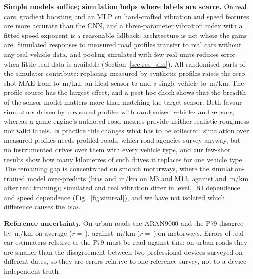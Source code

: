 \textbf{Simple models suffice; simulation helps where labels are scarce.}
On real cars, gradient boosting and an MLP on hand-crafted vibration and speed features are more accurate than the CNN, and a three-parameter vibration index with a fitted speed exponent is a reasonable fallback; architecture is not where the gains are.
Simulated responses to measured road profiles transfer to real cars without any real vehicle data, and pooling simulated with few real units reduces error when little real data is available (Section~\ref{sec:res_sim}).
All randomised parts of the simulator contribute: replacing measured by synthetic profiles raises the zero-shot MAE from \zsPsevenGbmMae{} to \zsIsoGbmMae\,m/km, an ideal sensor to \zsIdealGbmMae{} and a single vehicle to \zsFixVehGbmMae\,m/km.
The profile source has the largest effect, and a post-hoc check shows that the breadth of the sensor model matters more than matching the target sensor.
Both favour simulators driven by measured profiles with randomised vehicles and sensors, whereas a game engine's authored road meshes provide neither realistic roughness nor valid labels.
In practice this changes what has to be collected: simulation over measured profiles needs profiled roads, which road agencies survey anyway, but no instrumented drives over them with every vehicle type, and our few-shot results show how many kilometres of such drives it replaces for one vehicle type.
The remaining gap is concentrated on smooth motorways, where the simulation-trained model over-predicts (bias \zsPsevenGbmBiasMwThree{} and \zsPsevenGbmBiasMwThirteen\,m/km on M3 and M13, against \liraGbmBiasMwThree{} and \liraGbmBiasMwThirteen\,m/km after real training); simulated and real vibration differ in level, IRI dependence and speed dependence (Fig.~\ref{fig:simreal}), and we have not isolated which difference causes the bias.

\textbf{Reference uncertainty.}
On urban roads the ARAN9000 and the P79 disagree by \aranUrbanMae\,m/km on average ($r=$\,\aranUrbanR), against \aranMotorwayMae\,m/km ($r=$\,\aranMotorwayR) on motorways.
Errors of real-car estimators relative to the P79 must be read against this: on urban roads they are smaller than the disagreement between two professional devices surveyed on different dates, so they are errors relative to one reference survey, not to a device-independent truth.

